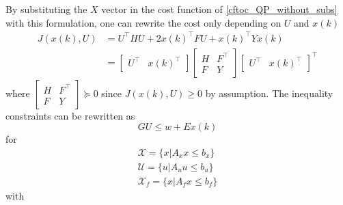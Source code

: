 By substituting the $X$ vector in the cost function of \ref{cftoc_QP_without_subs} with this formulation, one can rewrite the cost only depending on $U$ and $x(k)$
\begin{align*}
    J(x(k), U) & = U^\top HU + 2{x(k)}^\top FU + {x(k)}^\top Y x(k) \\
               & = \begin{bmatrix}
                       U^\top & {x(k)}^\top
                   \end{bmatrix}
    \begin{bmatrix}
        H & F^\top \\
        F & Y
    \end{bmatrix}
    {\begin{bmatrix}
         U^\top & {x(k)}^\top
     \end{bmatrix}}^\top
\end{align*}
where $\begin{bmatrix}H&F^\top\\F&Y\end{bmatrix}\succeq0$ since $J(x(k),U) \geq 0$ by assumption.
\newpar{}
The inequality constraints can be rewritten as
\begin{equation*}
    GU\leq w + Ex(k)
\end{equation*}
for
\begin{gather*}
    \mathcal{X} = \{x|A_x x \leq b_x\} \\
    \mathcal{U} = \{u|A_u u \leq b_u\} \\
    \mathcal{X}_f = \{x|A_f x \leq b_f\}
\end{gather*}
with
